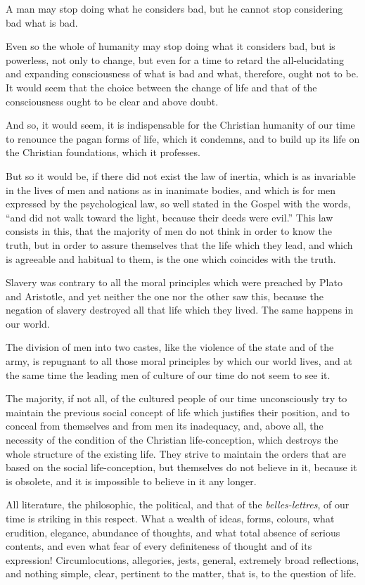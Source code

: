 \documentclass{book}
\begin{document}
A man may stop doing what he considers bad, but he cannot stop considering bad what is bad.

Even so the whole of humanity may stop doing what it considers bad, but is powerless, not only to change, but even for a time to retard the all-elucidating and expanding consciousness of what is bad and what, therefore, ought not to be. It would seem that the choice between the change of life and that of the consciousness ought to be clear and above doubt.

And so, it would seem, it is indispensable for the Christian humanity of our time to renounce the pagan forms of life, which it condemns, and to build up its life on the Christian foundations, which it professes.

But so it would be, if there did not exist the law of inertia, which is as invariable in the lives of men and nations as in inanimate bodies, and which is for men expressed by the psychological law, so well stated in the Gospel with the words, “and did not walk toward the light, because their deeds were evil.” This law consists in this, that the majority of men do not think in order to know the truth, but in order to assure themselves that the life which they lead, and which is agreeable and habitual to them, is the one which coincides with the truth.

Slavery was contrary to all the moral principles which were preached by Plato and Aristotle, and yet neither the one nor the other saw this, because the negation of slavery destroyed all that life which they lived. The same happens in our world.

The division of men into two castes, like the violence of the state and of the army, is repugnant to all those moral principles by which our world lives, and at the same time the leading men of culture of our time do not seem to see it.

The majority, if not all, of the cultured people of our time unconsciously try to maintain the previous social concept of life which justifies their position, and to conceal from themselves and from men its inadequacy, and, above all, the necessity of the condition of the Christian life-conception, which destroys the whole structure of the existing life. They strive to maintain the orders that are based on the social life-conception, but themselves do not believe in it, because it is obsolete, and it is impossible to believe in it any longer.

All literature, the philosophic, the political, and that of the \emph{belles-lettres}, of our time is striking in this respect. What a wealth of ideas, forms, colours, what erudition, elegance, abundance of thoughts, and what total absence of serious contents, and even what fear of every definiteness of thought and of its expression! Circumlocutions, allegories, jests, general, extremely broad reflections, and nothing simple, clear, pertinent to the matter, that is, to the question of life.
\end{document}

